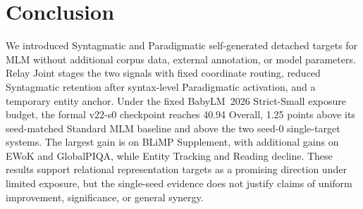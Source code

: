 \documentclass[11pt,a4paper]{article}
\begin{document}
\section{Conclusion}

We introduced Syntagmatic and Paradigmatic self-generated detached
targets for MLM without additional corpus data, external annotation,
or model parameters. Relay Joint stages the two signals with fixed
coordinate routing, reduced Syntagmatic retention after syntax-level
Paradigmatic activation, and a temporary entity anchor. Under the
fixed BabyLM~2026 Strict-Small exposure budget, the formal v22-s0
checkpoint reaches 40.94 Overall, 1.25 points above its seed-matched
Standard MLM baseline and above the two seed-0 single-target systems.
The largest gain is on BLiMP Supplement, with additional gains on
EWoK and GlobalPIQA, while Entity Tracking and Reading decline. These
results support relational representation targets as a promising
direction under limited exposure, but the single-seed evidence does
not justify claims of uniform improvement, significance, or general
synergy.

\FloatBarrier


\clearpage
\onecolumn

\end{document}
